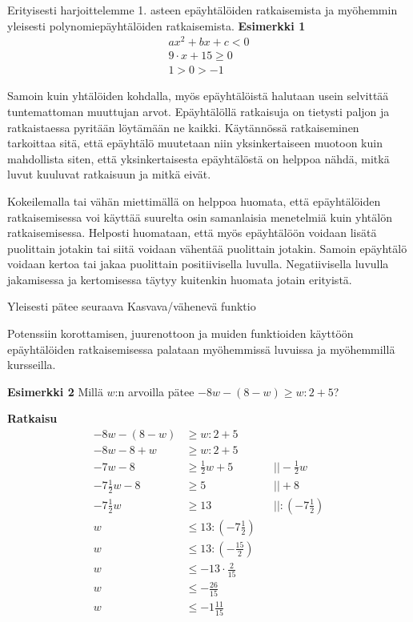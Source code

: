 Erityisesti harjoittelemme 1. asteen epäyhtälöiden ratkaisemista ja myöhemmin yleisesti polynomiepäyhtälöiden ratkaisemista.
\textbf{Esimerkki 1}
\begin{align*}
ax^2+bx+c<0 \\
9 \cdot x+15\geq 0 \\
1>0>-1
\end{align*}

Samoin kuin yhtälöiden kohdalla, myös epäyhtälöistä halutaan usein selvittää
tuntemattoman muuttujan arvot. Epäyhtälöllä ratkaisuja on tietysti paljon ja ratkaistaessa
pyritään löytämään ne kaikki. Käytännössä ratkaiseminen tarkoittaa sitä, että epäyhtälö
muutetaan niin yksinkertaiseen muotoon kuin mahdollista siten, että yksinkertaisesta epäyhtälöstä
on helppoa nähdä, mitkä luvut kuuluvat ratkaisuun ja mitkä eivät.

Kokeilemalla tai vähän miettimällä on helppoa huomata, että epäyhtälöiden ratkaisemisessa
voi käyttää suurelta osin samanlaisia menetelmiä kuin yhtälön ratkaisemisessa. Helposti huomataan,
että myös epäyhtälöön voidaan lisätä puolittain jotakin tai siitä voidaan vähentää puolittain jotakin.
Samoin epäyhtälö voidaan kertoa tai jakaa puolittain positiivisella luvulla. Negatiivisella luvulla
jakamisessa ja kertomisessa täytyy kuitenkin huomata jotain erityistä.


Yleisesti pätee seuraava
	Kasvava/vähenevä funktio




Potenssiin korottamisen, juurenottoon ja muiden funktioiden käyttöön epäyhtälöiden ratkaisemisessa palataan myöhemmissä luvuissa ja myöhemmillä kursseilla.

\textbf{Esimerkki 2}
Millä $w$:n arvoilla pätee $-8w-(8-w)\geq w:2+5$?

\textbf{Ratkaisu}
\begin{align*}
-8w-(8-w)&\geq w:2+5 \\
-8w-8+w&\geq w:2+5 \\
-7w-8&\geq \frac12 w+5  \ \ \ \ \ &&|| -\frac12 w \\
-7\frac12 w-8&\geq 5  \ \ \ \ \ &&|| +8 \\
-7\frac12 w&\geq 13  \ \ \ \ \ &&|| :(-7\frac12) \\
w&\leq 13:(-7\frac12) \\
w&\leq 13:(-\frac{15}{2}) \\
w&\leq -13\cdot \frac{2}{15} \\
w&\leq -\frac{26}{15} \\
w&\leq -1\frac{11}{15}
\end{align*}

